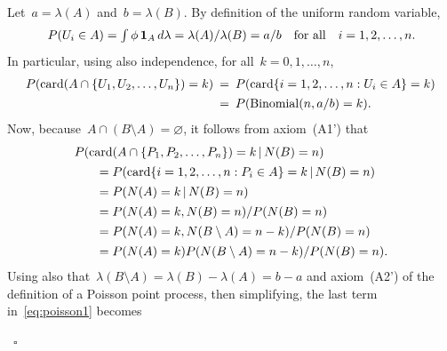 \documentclass[letterpaper,11pt,twoside,keywordsasfootnote,addressatend,noinfoline]{article}
\renewenvironment{proof}{\noindent{\bf Proof.}}{\hspace*{2mm}~$\square$}
\newcommand{\ind}{\mathbf{1}}
\newcommand{\n}{\hspace*{-5pt}}
\DeclareMathOperator{\binomial}{Binomial}
\DeclareMathOperator{\card}{card}
\begin{document}
\begin{proof}
 Let~$a = \lambda (A)$ and~$b = \lambda (B)$.
 By definition of the uniform random variable,
 $$ \begin{array}{c} P (U_i \in A) = \int \phi \,\ind_A \,d\lambda = \lambda (A) / \lambda (B) = a/b \quad \hbox{for all} \quad i = 1, 2, \ldots, n. \end{array} $$
 In particular, using also independence, for all~$k = 0, 1, \ldots, n$,
\begin{equation}
\label{eq:uniform}
\begin{array}{rcl}
  P (\card (A \cap \{U_1, U_2, \ldots, U_n \}) = k) & \n = \n & P (\card \{i = 1, 2, \ldots, n : U_i \in A \} = k) \vspace*{4pt} \\
                                                    & \n = \n & P (\binomial (n, a/b) = k). \end{array}
\end{equation}
 Now, because~$A \cap (B \setminus A) = \varnothing$, it follows from axiom~(A1') that
\begin{equation}
\label{eq:poisson1}
\begin{array}{l}
  P (\card (A \cap \{P_1, P_2, \ldots, P_n \}) = k \,| \,N (B) = n) \vspace*{4pt} \\ \hspace*{20pt} =
  P (\card \{i = 1, 2, \ldots, n : P_i \in A \} = k \,| \,N (B) = n) \vspace*{4pt} \\ \hspace*{20pt} =
  P (N (A) = k \,| \,N (B) = n) \vspace*{4pt} \\ \hspace*{20pt} =
  P (N (A) = k, N (B) = n) / P (N (B) = n) \vspace*{4pt} \\ \hspace*{20pt} =
  P (N (A) = k, N (B \setminus A) = n - k) / P (N (B) = n) \vspace*{4pt} \\ \hspace*{20pt} =
  P (N (A) = k) P (N (B \setminus A) = n - k) / P (N (B) = n). \end{array}
\end{equation}
 Using also that~$\lambda (B \setminus A) = \lambda (B) - \lambda (A) = b - a$ and axiom~(A2') of the definition of a Poisson point process, then simplifying, the last term in~\eqref{eq:poisson1} becomes

\end{proof}
\end{document}
